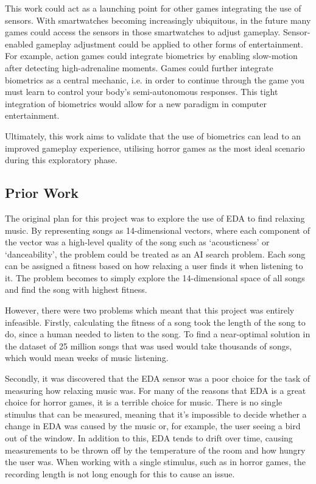 \documentclass[12pt,a4paper]{article}\usepackage[]{graphicx}\usepackage[]{color}
\begin{document}
This work could act as a launching point for other games integrating the use of sensors. With smartwatches becoming increasingly ubiquitous, in the future many games could access the sensors in those smartwatches to adjust gameplay. Sensor-enabled gameplay adjustment could be applied to other forms of entertainment. For example, action games could integrate biometrics by enabling slow-motion after detecting high-adrenaline moments. Games could further integrate biometrics as a central mechanic, i.e. in order to continue through the game you must learn to control your body's semi-autonomous responses. This tight integration of biometrics would allow for a new paradigm in computer entertainment.

Ultimately, this work aims to validate that the use of biometrics can lead to an improved gameplay experience, utilising horror games as the most ideal scenario during this exploratory phase.

\subsection{Prior Work}
The original plan for this project was to explore the use of EDA to find relaxing music. By representing songs as 14-dimensional vectors, where each component of the vector was a high-level quality of the song such as `acousticness' or `danceability', the problem could be treated as an AI search problem. Each song can be assigned a fitness based on how relaxing a user finds it when listening to it. The problem becomes to simply explore the 14-dimensional space of all songs and find the song with highest fitness.

However, there were two problems which meant that this project was entirely infeasible. Firstly, calculating the fitness of a song took the length of the song to do, since a human needed to listen to the song. To find a near-optimal solution in the dataset of 25 million songs that was used would take thousands of songs, which would mean weeks of music listening.

Secondly, it was discovered that the EDA sensor was a poor choice for the task of measuring how relaxing music was. For many of the reasons that EDA is a great choice for horror games, it is a terrible choice for music. There is no single stimulus that can be measured, meaning that it's impossible to decide whether a change in EDA was caused by the music or, for example, the user seeing a bird out of the window. In addition to this, EDA tends to drift over time, causing measurements to be thrown off by the temperature of the room and how hungry the user was. When working with a single stimulus, such as in horror games, the recording length is not long enough for this to cause an issue.
\end{document}

